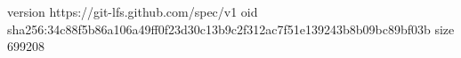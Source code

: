 version https://git-lfs.github.com/spec/v1
oid sha256:34c88f5b86a106a49ff0f23d30c13b9c2f312ac7f51e139243b8b09bc89bf03b
size 699208
